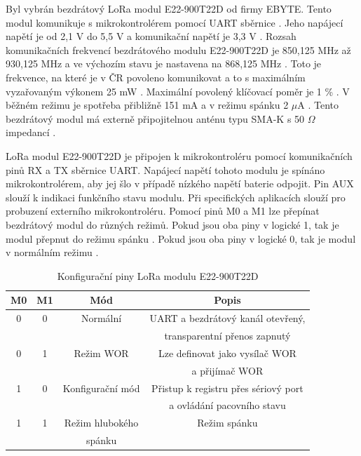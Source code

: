 Byl vybrán bezdrátový LoRa modul E22-900T22D od firmy EBYTE. Tento modul komunikuje s mikrokontrolérem pomocí UART sběrnice \cite{LoRa_ebyte}. Jeho napájecí napětí je od 
2,1 V do 5,5 V a komunikační napětí je 3,3 V \cite{LoRa_ebyte}. Rozsah komunikačních frekvencí bezdrátového modulu E22-900T22D je 850,125 MHz až 930,125 MHz a ve výchozím 
stavu je nastavena na 868,125 MHz \cite{LoRa_ebyte}. Toto je frekvence, na které je v ČR povoleno komunikovat a to s maximálním vyzařovaným výkonem 25 mW \cite{CTU}. 
Maximální povolený klíčovací poměr je 1 \% \cite{CTU}. %
V běžném režimu je spotřeba přibližně 151 mA a v režimu spánku 2 $\mu$A \cite{LoRa_ebyte}. Tento bezdrátový modul má externě připojitelnou anténu typu SMA-K s 50 $\Omega$ 
impedancí \cite{LoRa_ebyte}.

LoRa modul E22-900T22D je připojen k mikrokontroléru pomocí komunikačních pinů RX a TX sběrnice UART. Napájecí napětí tohoto modulu je spínáno mikrokontrolérem, aby jej 
šlo v případě nízkého napětí baterie odpojit. Pin AUX slouží k indikaci funkčního stavu modulu. Při specifických aplikacích slouží pro probuzení externího mikrokontroléru. 
Pomocí pinů M0 a M1 lze přepínat bezdrátový modul do různých režimů. Pokud jsou oba piny v logické 1, 
tak je modul přepnut do režimu spánku \cite{LoRa_ebyte}. Pokud jsou oba piny v logické 0, tak je modul v normálním režimu \cite{LoRa_ebyte}. 

\begin{table}[!h]
  \caption[Konfigurační piny LoRa modulu E22-900T22D]{Konfigurační piny LoRa modulu E22-900T22D \cite{LoRa_ebyte}}
  \begin{center}
  	\small
	  \begin{tabular}{|c|c|c|c|}
	    \hline
	    \textbf{M0}	& \textbf{M1}	& \textbf{Mód} & \textbf{Popis} \\
	    \hline
	    0	& 0 & Normální & UART a bezdrátový kanál otevřený, \\ 
      & & &transparentní přenos zapnutý \\ 
	    \hline
	    0	& 1 & Režim WOR & Lze definovat jako vysílač WOR \\
      & & & a přijímač WOR \\ 
	    \hline
	    1 & 0 & Konfigurační mód & Přistup k registru přes sériový port \\
      & & & a ovládání pacovního stavu \\
	    \hline
      1 & 1 & Režim hlubokého & Režim spánku \\
      & & spánku & \\
	    \hline
	  \end{tabular}
  \end{center}
\end{table}

